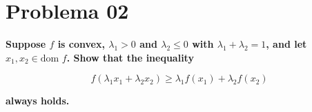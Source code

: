 \section*{Problema 02}

\textbf{Suppose $f$ is convex, $\lambda_1 >0$ and $\lambda_2 \leq 0$ with $\lambda_1 + \lambda_2 =1$, and let $x_1, x_2 \in \text{dom } f$. Show that the inequality}

\begin{equation*}
    f(\lambda_1 x_1 + \lambda_2 x_2) \geq \lambda_1 f(x_1) + \lambda_2 f(x_2)
\end{equation*}

\textbf{always holds.}
